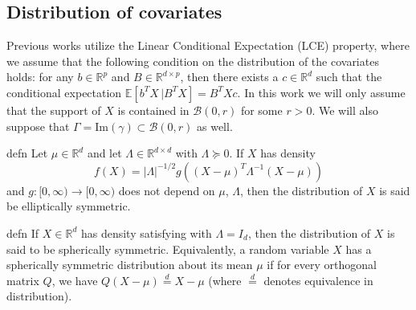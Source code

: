 \documentclass[11pt]{article}
\begin{document}
\subsection{Distribution of covariates}
Previous works utilize the Linear Conditional Expectation (LCE) property, where we assume that the following condition on the distribution of the covariates holds: for any $b \in \mathbb{R}^p$ and $B \in \mathbb{R}^{d\times p}$, then there exists a $c \in \mathbb{R}^d$ such that the conditional expectation $\mathbb{E}[b^{T}X \, | B^{T}X] = B^{T}Xc$. In this work we will only assume that the support of $X$ is contained in $\mathcal{B}(0, r)$ for some $r > 0$. We will also suppose that $\Gamma  = \text{Im}(\gamma) \subset \mathcal{B}(0, r)$ as well. 

\begin{restatable}{defn}{}\label{def: elliptical symmetry}
Let $\mu \in \mathbb{R}^d$ and let $\Lambda \in \mathbb{R}^{d\times d}$ with $\Lambda \succeq 0$. If $X$ has density
\begin{equation}
     f(X) = |\Lambda|^{-1/2}g\left((X-\mu)^{T}\Lambda^{-1}(X - \mu)\right)
\end{equation}
and $g:[0, \infty) \rightarrow[0, \infty)$ does not depend on $\mu$, $\Lambda$, then the distribution of $X$ is said be elliptically symmetric. 
\end{restatable}

\begin{restatable}{defn}{}\label{def: spherical symmetry}
If $X\in \mathbb{R}^d$ has density satisfying  with $\Lambda = I_d$, then the distribution of $X$ is said to be spherically symmetric. Equivalently, a random variable $X$ has a spherically symmetric distribution about its mean $\mu$ if for every orthogonal matrix $Q$, we have $Q(X - \mu) \overset{d}{=} X - \mu$ (where $\overset{d}{=}$ denotes equivalence in distribution). 
\end{restatable}
\end{document}
